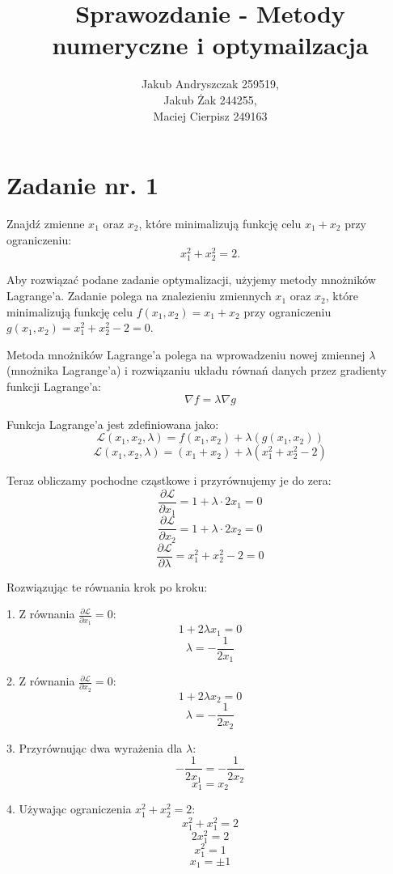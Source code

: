 \documentclass{article}
\begin{document}
\title{Sprawozdanie - Metody numeryczne i optymailzacja}
\author{Jakub Andryszczak 259519,\\ Jakub Żak 244255,\\ Maciej Cierpisz 249163}
\date{}
\maketitle

\newpage
\tableofcontents

\newpage
\section{Zadanie nr. 1}
Znajdź zmienne \(x_1\) oraz \(x_2\), które minimalizują funkcję celu \(x_1 + x_2\) przy ograniczeniu:
\[
x_1^2 + x_2^2 = 2.
\]

Aby rozwiązać podane zadanie optymalizacji, użyjemy metody mnożników Lagrange'a. Zadanie polega na znalezieniu zmiennych \(x_1\) oraz \(x_2\), które minimalizują funkcję celu \(f(x_1, x_2) = x_1 + x_2\) przy ograniczeniu \(g(x_1, x_2) = x_1^2 + x_2^2 - 2 = 0\).

Metoda mnożników Lagrange'a polega na wprowadzeniu nowej zmiennej \(\lambda\) (mnożnika Lagrange'a) i rozwiązaniu układu równań danych przez gradienty funkcji Lagrange'a:
\[ \nabla f = \lambda \nabla g \]

Funkcja Lagrange'a jest zdefiniowana jako:
\[ \mathcal{L}(x_1, x_2, \lambda) = f(x_1, x_2) + \lambda (g(x_1, x_2)) \]
\[ \mathcal{L}(x_1, x_2, \lambda) = (x_1 + x_2) + \lambda (x_1^2 + x_2^2 - 2) \]

Teraz obliczamy pochodne cząstkowe i przyrównujemy je do zera:
\[ \frac{\partial \mathcal{L}}{\partial x_1} = 1 + \lambda \cdot 2x_1 = 0 \]
\[ \frac{\partial \mathcal{L}}{\partial x_2} = 1 + \lambda \cdot 2x_2 = 0 \]
\[ \frac{\partial \mathcal{L}}{\partial \lambda} = x_1^2 + x_2^2 - 2 = 0 \]

Rozwiązując te równania krok po kroku:

1. Z równania \(\frac{\partial \mathcal{L}}{\partial x_1} = 0\):
\[ 1 + 2\lambda x_1 = 0 \]
\[ \lambda = -\frac{1}{2x_1} \]

2. Z równania \(\frac{\partial \mathcal{L}}{\partial x_2} = 0\):
\[ 1 + 2\lambda x_2 = 0 \]
\[ \lambda = -\frac{1}{2x_2} \]

3. Przyrównując dwa wyrażenia dla \(\lambda\):
\[ -\frac{1}{2x_1} = -\frac{1}{2x_2} \]
\[ x_1 = x_2 \]

4. Używając ograniczenia \(x_1^2 + x_2^2 = 2\):
\[ x_1^2 + x_1^2 = 2 \]
\[ 2x_1^2 = 2 \]
\[ x_1^2 = 1 \]
\[ x_1 = \pm 1 \]
\end{document}
